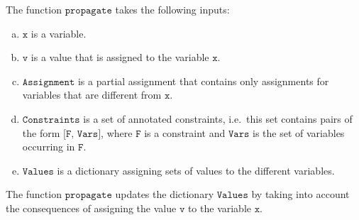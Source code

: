The function $\texttt{propagate}$ takes the following inputs:
\begin{enumerate}[(a)]
\item $\texttt{x}$ is a variable.
\item $\texttt{v}$ is a value that is assigned to the variable $\texttt{x}$.
\item $\texttt{Assignment}$ is a partial assignment that contains only assignments for variables that are
      different from $\texttt{x}$.
\item $\texttt{Constraints}$ is a set of annotated constraints, i.e.~this set contains pairs of the form 
      $\texttt{[F, Vars]}$, where $\texttt{F}$ is a constraint and $\texttt{Vars}$ is the set of
      variables occurring in $\texttt{F}$.
\item $\texttt{Values}$ is a dictionary assigning sets of values to the different variables.
\end{enumerate}
The function $\texttt{propagate}$ updates the dictionary $\texttt{Values}$ by taking into account the
consequences of assigning the value $\texttt{v}$ to the variable $\texttt{x}$.
